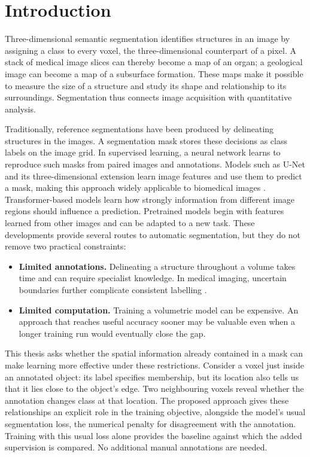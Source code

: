 \documentclass[12pt,a4paper]{article}
\begin{document}
\section{Introduction}\label{sec:introduction}
\label{sec:motivation}\label{sec:research-questions}

Three-dimensional semantic segmentation identifies structures in an image
by assigning a class to every voxel, the three-dimensional counterpart
of a pixel. A stack of medical image slices can thereby become a map of
an organ; a geological image can become a map of a subsurface formation.
These maps make it possible to measure the size of a structure and study
its shape and relationship to its surroundings. Segmentation thus connects
image acquisition with quantitative analysis.

Traditionally, reference segmentations have been produced by delineating
structures in the images. A segmentation mask stores these decisions as
class labels on the image grid. In supervised learning, a neural network
learns to reproduce such masks from paired images and annotations.
Models such as U-Net and its three-dimensional extension learn image
features and use them to predict a mask, making this approach widely
applicable to biomedical images \cite{ronneberger2015unet,cicek2016unet}.
Transformer-based models learn how strongly information from different
image regions should influence a prediction. Pretrained models begin
with features learned from other images and can be adapted to a new task. These developments provide several routes to automatic
segmentation, but they do not remove two practical constraints:
\begin{itemize}
\item \textbf{Limited annotations.} Delineating a structure throughout a
volume takes time and can require specialist knowledge. In medical
imaging, uncertain boundaries further complicate consistent labelling
\cite{wang2021annotation}.
\item \textbf{Limited computation.} Training a volumetric model can be
expensive. An approach that reaches useful accuracy sooner may be
valuable even when a longer training run would eventually close the gap.
\end{itemize}

This thesis asks whether the spatial information already contained in a mask
can make learning more effective under these restrictions. Consider a voxel
just inside an annotated object: its label specifies membership, but its
location also tells us that it lies close to the object's edge. Two
neighbouring voxels reveal whether the annotation changes class at that
location. The proposed approach gives these relationships an explicit role
in the training objective, alongside the model's usual segmentation loss,
the numerical penalty for disagreement with the annotation. Training with
this usual loss alone provides the baseline against which the added
supervision is compared. No additional manual annotations are needed.
\end{document}
